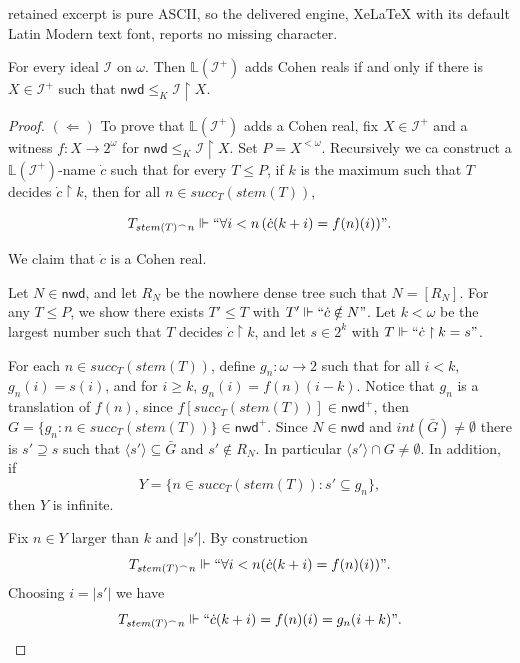 \documentclass[10pt,a4paper]{amsart}
\newcommand{\id}{\mathcal{I}}
\newcommand{\li}{\mathbb{L}(\mathcal{I}^+)}
\newcommand{\nwd}{\mathsf{nwd}}
\newcommand{\restr}[2]{#1\upharpoonright {#2}}
\begin{document}
retained excerpt is pure ASCII, so the delivered engine, XeLaTeX with its default Latin Modern text font, reports no missing character.
\begin{theorem} \label{Cohen reals}
    For every ideal $\id$ on $\omega$. Then $\li$ adds Cohen reals if and only if there is $X\in\id^+$ such that $\nwd \leq_K \restr{\id}{X}$.
\end{theorem}

\begin{proof}
$(\Leftarrow)$ To prove that $\li$ adds a Cohen real, fix $X \in \id^+$ and a witness $f: X \to 2^\omega$ for $\nwd \leq_K \id \upharpoonright X$. Set $P = X^{<\omega}$. Recursively we ca construct a $\li$-name $\dot c$ such that for every $T \leq P$, if $k$ is the maximum such that $T$ decides $\dot c \upharpoonright k$, then for all $n\in succ_T(stem(T))$,

\begin{displaymath}
    T_{stem(T)^\frown n}\Vdash `` \forall i<n \, ( \dot c(k+i)=f(n)(i))".
\end{displaymath}
    
We claim that $\dot c$ is a Cohen real.

Let $N \in \nwd$, and let $R_N$ be the nowhere dense tree such that $N = [R_N]$. For any $T \leq P$, we show there exists $T' \leq T$ with $T' \Vdash ``\dot c \notin N"$. Let $k < \omega$ be the largest number such that $T$ decides $\dot c \upharpoonright k$, and let $s \in 2^k$ with $T \Vdash ``\dot c \upharpoonright k = s"$.

For each $n \in succ_T(stem(T))$, define $g_n : \omega \to 2$ such that for all $i<k$, $g_n(i)=s(i)$, and for $i \geq k$, $g_n(i)=f(n)(i-k)$. Notice that $g_n$ is a translation of $f(n)$, since $f[succ_T(stem(T))]\in \nwd^+$, then $G=\{g_n:n\in succ_T(stem(T))\}\in \nwd^+$. Since $N\in \nwd$ and $int(\bar{G})\not=\emptyset$ there is $s'\supseteq s$ such that $\langle s'\rangle\subseteq \bar G$ and $s'\notin R_N$. In particular $\langle s'\rangle\cap G\not=\emptyset$. In addition, if \[Y=\{n\in succ_T(stem(T)):s'\subseteq g_n\},\] then $Y$ is infinite.

Fix $n\in Y$ larger than $k$ and $|s'|$. By construction
\begin{displaymath}
    T_{stem(T)^\frown n}\Vdash``\forall i<n (\dot c(k+i)=f(n)(i))".
\end{displaymath}
Choosing $i=|s'|$ we have
\begin{displaymath}
    T_{stem(T)^\frown n}\Vdash``\dot c(k+i)=f(n)(i)=g_n(i+k)".
\end{displaymath}


\end{proof}
\end{document}
